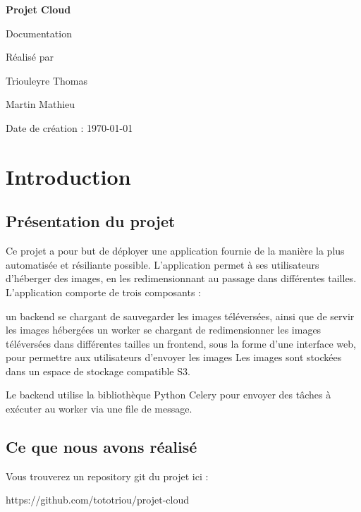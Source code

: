 \documentclass{report}
\begin{document}
\begin{titlepage}
    \centering
    \vspace*{2cm}
    {\Huge\bfseries Projet Cloud\par Documentation}
    \vspace{1cm}
    \vfill
    Réalisé par\par
    Triouleyre Thomas\par
    Martin Mathieu

    \vfill

    {\large Date de création : \today\par}
\end{titlepage}

\tableofcontents

\chapter{Introduction}
\section{Présentation du projet}
Ce projet a pour but de déployer une application fournie de la manière la plus automatisée et résiliante possible. L’application permet à ses utilisateurs d’héberger des images, en les redimensionnant au passage dans différentes tailles.
L’application comporte de trois composants :

un backend se chargant de sauvegarder les images téléversées, ainsi que de servir les images hébergées
un worker se chargant de redimensionner les images téléversées dans différentes tailles
un frontend, sous la forme d’une interface web, pour permettre aux utilisateurs d’envoyer les images
Les images sont stockées dans un espace de stockage compatible S3.

Le backend utilise la bibliothèque Python Celery pour envoyer des tâches à exécuter au worker via une file de message.

\section{Ce que nous avons réalisé}

Vous trouverez un repository git du projet ici :
\begin{center}
    https://github.com/tototriou/projet-cloud
\end{center}
 
\end{document}
